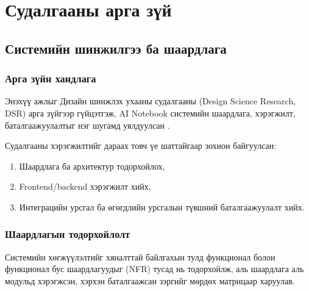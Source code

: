 ﻿\chapter{Судалгааны арга зүй}
\label{ch:methodology}

\section{Системийн шинжилгээ ба шаардлага}
\label{sec:system_analysis}

\subsection{Арга зүйн хандлага}

Энэхүү ажлыг Дизайн шинжлэх ухааны судалгааны (Design Science Research, DSR) арга зүйгээр гүйцэтгэж, AI Notebook системийн шаардлага, хэрэгжилт, баталгаажуулалтыг нэг шугамд уялдуулсан \cite{hevner2004}\cite{peffers2007}.

Судалгааны хэрэгжилтийг дараах товч үе шаттайгаар зохион байгуулсан:

\begin{enumerate}
    \item Шаардлага ба архитектур тодорхойлох,
    \item Frontend/backend хэрэгжилт хийх,
    \item Интеграцийн урсгал ба өгөгдлийн урсгалын түвшний баталгаажуулалт хийх.
\end{enumerate}
\subsection{Шаардлагын тодорхойлолт}

Системийн хөгжүүлэлтийг хяналттай байлгахын тулд функционал болон функционал бус шаардлагуудыг (NFR) тусад нь тодорхойлж, аль шаардлага аль модульд хэрэгжсэн, хэрхэн баталгаажсан зэргийг мөрдөх матрицаар харуулав.

